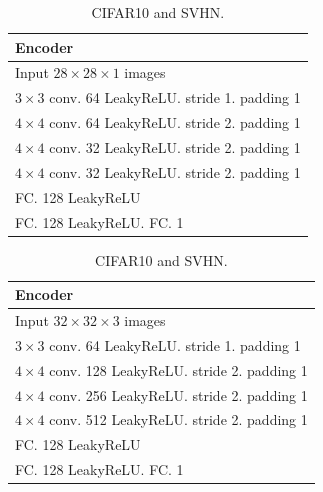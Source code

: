 \begin{table}[!h]
\caption{Architecture of IGEBM}
    \centering
    \begin{subtable}[h]{.5\textwidth}
    \caption{MNIST and Fashion-MNIST.}
    \centering
        \begin{tabular}{|l|}
        \toprule
        \textbf{Encoder} \\
        \midrule
        Input $28\times28\times1$ images  \\
        \hline 
        $3\times3$ conv. 64 LeakyReLU. stride 1. padding 1  \\
        \hline 
        $4\times4$ conv. 64 LeakyReLU. stride 2. padding 1 \\
        \hline 
        $4\times4$ conv. 32 LeakyReLU. stride 2. padding 1  \\
        \hline
        $4\times4$ conv. 32 LeakyReLU. stride 2. padding 1 \\
        \hline
        FC. 128 LeakyReLU \\
        \hline
        FC. 128 LeakyReLU. FC. 1 \\
        \bottomrule
        \end{tabular}
    \end{subtable}%
    \begin{subtable}[h]{.5\textwidth}
    \caption{CIFAR10 and SVHN.}
    \centering
        \begin{tabular}{|l|}
        \toprule
        \textbf{Encoder}  \\
        \midrule
        Input $32\times32\times3$ images  \\
        \hline 
        $3\times3$ conv. 64 LeakyReLU. stride 1. padding 1  \\
        \hline 
        $4\times4$ conv. 128 LeakyReLU. stride 2. padding 1 \\
        \hline 
        $4\times4$ conv. 256 LeakyReLU. stride 2. padding 1  \\
        \hline
        $4\times4$ conv. 512 LeakyReLU. stride 2. padding 1  \\
        \hline
        FC. 128 LeakyReLU \\
        \hline
        FC. 128 LeakyReLU. FC. 1\\
        \bottomrule
        \end{tabular}
    \vspace*{1ex}
    \end{subtable}
    \label{appendex:tab:arch-igebm}
\end{table}

